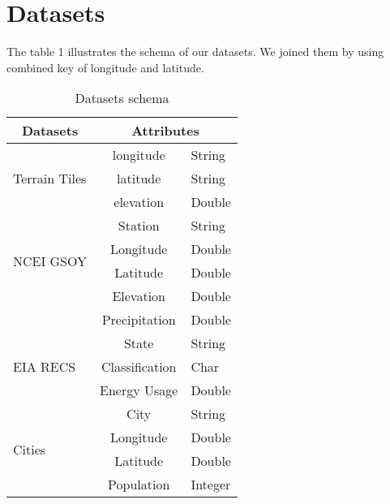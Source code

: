 \documentclass[11pt]{article}
\begin{document}
\section{Datasets}
The table 1 illustrates the schema of our datasets. We joined them by using combined key of longitude and latitude.
\begin{table}[!h]
\centering
\begin{tabular}{|l|lll|}
\hline
\multicolumn{1}{|c|}{Datasets}     & \multicolumn{3}{|c|}{Attributes}                      \\ \hline
\multirow{3}{*}{Terrain Tiles} & \multicolumn{1}{|c|}{longitude} & \multicolumn{2}{l|}{String} \\ \cline{2-4}
          & \multicolumn{1}{|c|}{latitude} & \multicolumn{2}{l|}{String} \\ \cline{2-4} 
          & \multicolumn{1}{|c|}{elevation}   & \multicolumn{2}{l|}{Double} \\ \hline
\multirow{4}{*}{NCEI GSOY} & \multicolumn{1}{|c|}{Station} & \multicolumn{2}{l|}{String} \\ \cline{2-4} 
          & \multicolumn{1}{|c|}{Longitude}   & \multicolumn{2}{l|}{Double} \\ \cline{2-4}
          & \multicolumn{1}{|c|}{Latitude}   & \multicolumn{2}{l|}{Double} \\ \cline{2-4}
          & \multicolumn{1}{|c|}{Elevation}   & \multicolumn{2}{l|}{Double} \\ \cline{2-4}
          & \multicolumn{1}{|c|}{Precipitation}   & \multicolumn{2}{l|}{Double} \\ \hline
\multirow{3}{*}{EIA RECS} & \multicolumn{1}{|c|}{State} & \multicolumn{2}{l|}{String} \\ \cline{2-4} 
          & \multicolumn{1}{|c|}{Classification}   & \multicolumn{2}{l|}{Char} \\ \cline{2-4}
          & \multicolumn{1}{|c|}{Energy Usage}   & \multicolumn{2}{l|}{Double}\\ \hline
\multirow{4}{*}{Cities} & \multicolumn{1}{|c|}{City} & \multicolumn{2}{l|}{String} \\ \cline{2-4} 
          & \multicolumn{1}{|c|}{Longitude}   & \multicolumn{2}{l|}{Double} \\ \cline{2-4}
          & \multicolumn{1}{|c|}{Latitude}   & \multicolumn{2}{l|}{Double} \\ \cline{2-4}
          & \multicolumn{1}{|c|}{Population}   & \multicolumn{2}{l|}{Integer}\\ \hline
\end{tabular}
\caption{\label{tab:acc5} Datasets schema}
\end{table}
\end{document}
